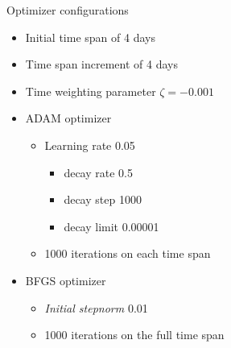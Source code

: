 \begin{frame}{Optimizer configurations}
    \begin{itemize}
        \item<1-> Initial time span of 4 days
        \item<1-> Time span increment of 4 days
        \item<2-> Time weighting parameter $\zeta = -0.001$
        \item<3-> ADAM optimizer
        \begin{itemize}
            \item Learning rate 0.05
            \begin{itemize}
                \item decay rate 0.5
                \item decay step 1000
                \item decay limit 0.00001
            \end{itemize}
            \item 1000 iterations on each time span
        \end{itemize}
        \item<4-> BFGS optimizer
        \begin{itemize}
            \item \textit{Initial stepnorm} 0.01
            \item 1000 iterations on the full time span
        \end{itemize}
    \end{itemize}
\end{frame}

